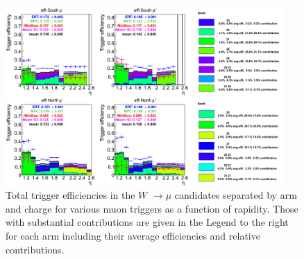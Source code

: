 \begin{figure}[h!]

  \centering

  \includegraphics[width=0.95\textwidth]{./figures/totaltrigeffi13_all_wpt1.png}
  \caption{\label{fig:totaltrigeffi_all_wpt1} Total trigger efficiencies in the $W$ $\rightarrow \mu$ candidates separated by arm and charge for various muon triggers as a function of rapidity. Those with substantial contributions are given in the Legend to the right for each arm including their average efficiencies and relative contributions.}

\end{figure}
\clearpage

